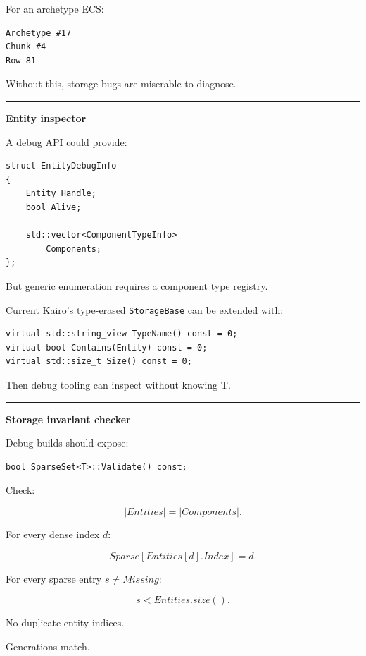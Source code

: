 For an archetype ECS:

\begin{verbatim}
Archetype #17
Chunk #4
Row 81
\end{verbatim}

Without this, storage bugs are miserable to diagnose.

\begin{center}\rule{0.5\linewidth}{0.5pt}\end{center}

\textbf{Entity inspector}

A debug API could provide:

\begin{verbatim}
struct EntityDebugInfo
{
    Entity Handle;
    bool Alive;

    std::vector<ComponentTypeInfo>
        Components;
};
\end{verbatim}

But generic enumeration requires a component type registry.

Current Kairo's type-erased \texttt{StorageBase} can be extended with:

\begin{verbatim}
virtual std::string_view TypeName() const = 0;
virtual bool Contains(Entity) const = 0;
virtual std::size_t Size() const = 0;
\end{verbatim}

Then debug tooling can inspect without knowing T.

\begin{center}\rule{0.5\linewidth}{0.5pt}\end{center}

\textbf{Storage invariant checker}

Debug builds should expose:

\begin{verbatim}
bool SparseSet<T>::Validate() const;
\end{verbatim}

Check:

\[
|Entities|=|Components|.
\]

For every dense index \(d\):

\[
Sparse[Entities[d].Index]=d.
\]

For every sparse entry \(s\neq Missing\):

\[
s<Entities.size().
\]

No duplicate entity indices.

Generations match.

